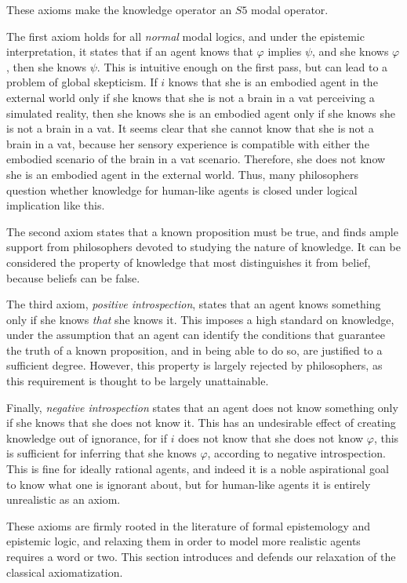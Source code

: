 These axioms make the knowledge operator an $\mathit{S5}$ modal operator. 

The first axiom holds for all \emph{normal} modal logics, and under the epistemic interpretation, it states that if an agent knows that $\varphi$ implies $\psi$, and she knows $\varphi$, then she knows $\psi$. This is intuitive enough on the first pass, but can lead to a problem of global skepticism. If $i$ knows that she is an embodied agent in the external world only if she knows that she is not a brain in a vat perceiving a simulated reality, then she knows she is an embodied agent only if she knows she is not a brain in a vat. It seems clear that she cannot know that she is not a brain in a vat, because her sensory experience is compatible with either the embodied scenario of the brain in a vat scenario. Therefore, she does not know she is an embodied agent in the external world. Thus, many philosophers question whether knowledge for human-like agents is closed under logical implication like this.

The second axiom states that a known proposition must be true, and finds ample support from philosophers devoted to studying the nature of knowledge. It can be considered the property of knowledge that most distinguishes it from belief, because beliefs can be false.

The third axiom, \emph{positive introspection}, states that an agent knows something only if she knows \emph{that} she knows it. This imposes a high standard on knowledge, under the assumption that an agent can identify the conditions that guarantee the truth of a known proposition, and in being able to do so, are justified to a sufficient degree. However, this property is largely rejected by philosophers, as this requirement is thought to be largely unattainable. 

Finally, \emph{negative introspection} states that an agent does not know something only if she knows that she does not know it. This has an undesirable effect of creating knowledge out of ignorance, for if $i$ does not know that she does not know $\varphi$, this is sufficient for inferring that she knows $\varphi$, according to negative introspection. This is fine for ideally rational agents, and indeed it is a noble aspirational goal to know what one is ignorant about, but for human-like agents it is entirely unrealistic as an axiom.

These axioms are firmly rooted in the literature of formal epistemology and epistemic logic, and relaxing them in order to model more realistic agents requires a word or two. This section introduces and defends our relaxation of the classical axiomatization.

